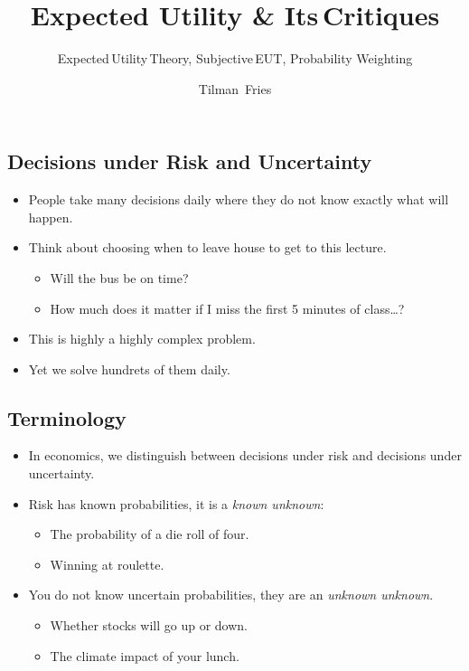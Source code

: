 \documentclass[
  letterpaper,
  DIV=11,
  numbers=noendperiod]{scrartcl}
\title{Expected Utility \& Its\,Critiques}
\subtitle{Expected\,Utility\,Theory, Subjective\,EUT, Probability
Weighting}
\author{Tilman~Fries}
\date{}
\providecommand{\tightlist}{%
  \setlength{\itemsep}{0pt}\setlength{\parskip}{0pt}}\usepackage{longtable,booktabs,array}
\begin{document}
\maketitle


\subsection{Decisions under Risk and
Uncertainty}\label{decisions-under-risk-and-uncertainty}

\begin{itemize}
\tightlist
\item
  People take many decisions daily where they do not know exactly what
  will happen.
\item
  Think about choosing when to leave house to get to this lecture.

  \begin{itemize}
  \tightlist
  \item
    Will the bus be on time?
  \item
    How much does it matter if I miss the first 5 minutes of
    class\ldots?
  \end{itemize}
\item
  This is highly a highly complex problem.
\item
  Yet we solve hundrets of them daily.
\end{itemize}

\subsection{Terminology}\label{terminology}

\begin{itemize}
\tightlist
\item
  In economics, we distinguish between decisions under {risk} and
  decisions under {uncertainty}.
\item
  Risk has known probabilities, it is a \emph{known unknown}:

  \begin{itemize}
  \tightlist
  \item
    The probability of a die roll of four.
  \item
    Winning at roulette.
  \end{itemize}
\item
  You do not know uncertain probabilities, they are an \emph{unknown
  unknown}.

  \begin{itemize}
  \tightlist
  \item
    Whether stocks will go up or down.
  \item
    The climate impact of your lunch.
  \end{itemize}
\end{itemize}
\end{document}
